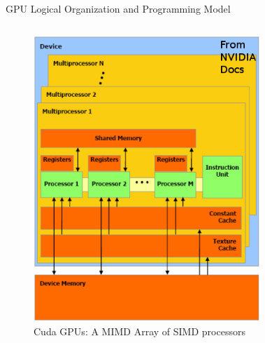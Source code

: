 \documentclass[10pt, red]{beamer}
\begin{document}
	\begin{frame}{GPU Logical Organization and Programming Model}
		\begin{columns}
		 	\begin{figure}
				\centering
				\includegraphics[width=\textwidth, height=0.6\textheight]{img/HWModel}
				\caption{Cuda GPUs: A MIMD Array of SIMD processors}
		 	\end{figure} 
			\begin{figure}
				\centering

\end{figure}
\end{columns}
\end{frame}
\end{document}
